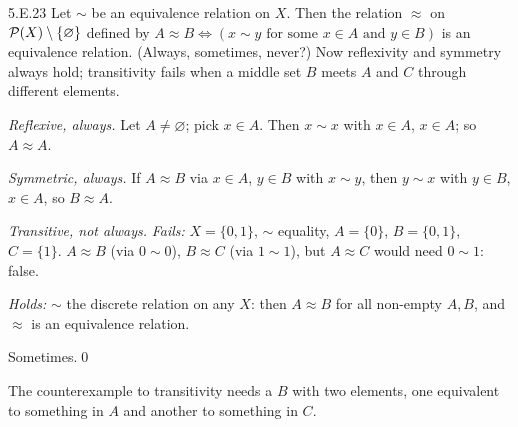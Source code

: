 \begin{bookex}[essential]{5.E.23}
Let $\sim$ be an equivalence relation on $X$. Then the relation $\approx$ on $\mathcal{P}(X)\setminus\{\varnothing\}$ defined by $A\approx B\Leftrightarrow(x\sim y\text{ for some }x\in A\text{ and }y\in B)$ is an equivalence relation. (Always, sometimes, never?)
\solution
\plan Now reflexivity and symmetry always hold; transitivity fails when a middle set $B$ meets $A$ and $C$ through different elements.
\begin{steps}
\item \emph{Reflexive, always.} Let $A\ne\varnothing$; pick $x\in A$. Then $x\sim x$  with $x\in A$, $x\in A$; so $A\approx A$.
\item \emph{Symmetric, always.} If $A\approx B$ via $x\in A$, $y\in B$ with $x\sim y$, then $y\sim x$  with $y\in B$, $x\in A$, so $B\approx A$.
\item \emph{Transitive, not always.} \emph{Fails:} $X=\{0,1\}$, $\sim$ equality, $A=\{0\}$, $B=\{0,1\}$, $C=\{1\}$. $A\approx B$ (via $0\sim0$), $B\approx C$ (via $1\sim1$), but $A\approx C$ would need $0\sim1$: false.
\item \emph{Holds:} $\sim$ the discrete relation on any $X$: then $A\approx B$ for all non-empty $A,B$, and $\approx$ is an equivalence relation.
\end{steps}
\conclusion Sometimes.\qed
\begin{compare}
\item The counterexample to transitivity needs a $B$ with two elements, one equivalent to something in $A$ and another to something in $C$.
\end{compare}
\end{bookex}
